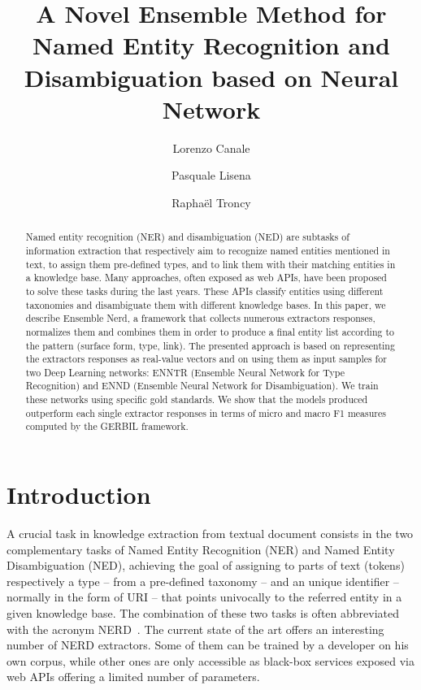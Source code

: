 \documentclass{llncs}
\begin{document}
\title{A Novel Ensemble Method for Named Entity Recognition and Disambiguation based on Neural Network}

\author{
Lorenzo Canale \and Pasquale Lisena
\and Rapha\"el Troncy}

\maketitle


\begin{abstract}
Named entity recognition (NER) and disambiguation (NED) are subtasks of information extraction that respectively aim to recognize named entities mentioned in text, to assign them pre-defined types, and to link them with their matching entities in a knowledge base. Many approaches, often exposed as web APIs, have been proposed to solve these tasks during the last years. These APIs classify entities using different taxonomies and disambiguate them with different knowledge bases. In this paper, we describe Ensemble Nerd, a framework that collects numerous extractors responses, normalizes them and combines them in order to produce a final entity list according to the pattern (surface form, type, link). The presented approach is based on representing the extractors responses as real-value vectors and on using them as input samples for two Deep Learning networks: ENNTR (Ensemble Neural Network for Type Recognition) and ENND (Ensemble Neural Network for Disambiguation). We train these networks using specific gold standards. We show that the models produced outperform each single extractor responses in terms of micro and macro F1 measures computed by the GERBIL framework. 
\end{abstract}


\section{Introduction}
\label{sec:introduction}
A crucial task in knowledge extraction from textual document consists in the two complementary tasks of Named Entity Recognition (NER) and Named Entity Disambiguation (NED), achieving the goal of assigning to parts of text (tokens) respectively a type -- from a pre-defined taxonomy -- and an unique identifier -- normally in the form of URI -- that points univocally to the referred entity in a given knowledge base. The combination of these two tasks is often abbreviated with the acronym NERD~\cite{nerd1,nerd2}. The current state of the art offers an interesting number of NERD extractors. Some of them can be trained by a developer on his own corpus, while other ones are only accessible as black-box services exposed via web APIs offering a limited number of parameters.
\end{document}
